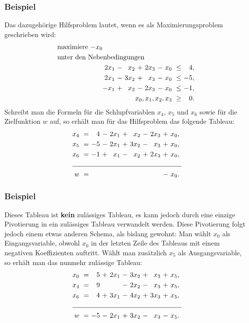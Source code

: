\documentclass[smaller]{beamer}
\begin{document}
\begin{frame}
 \frametitle{Beispiel}
 Das dazugehörige \alert{Hilfsproblem} lautet, wenn es als \alert{Maximierungsproblem} geschrieben wird:
\begin{align*}
\begin{alignedat}{6}
& \text{maximiere $-x_0$} & & & & & & & & &\\
& \rlap{unter den Nebenbedingungen} & & & & & & & & & \\
&& 2x_1 &\ - &\  x_2 &\ + &\ 2x_3 &\ - &\ x_0 &\ \leq &\  4,\ \\ 
&& 2x_1 &\ - &\ 3x_2 &\ + &\  x_3 &\ - &\ x_0 &\ \leq &\ -5,\ \\ 
&& -x_1 &\ + &\  x_2 &\ - &\ 2x_3 &\ - &\ x_0 &\ \leq &\ -1,\ \\ 
&& & & & & & & \llap{$x_0,x_1,x_2,x_3$} &\ \geq &\ 0.\
\end{alignedat}
\end{align*}
Schreibt man die Formeln für die Schlupfvariablen $x_4$, $x_5$ und $x_6$ sowie für die Zielfunktion $w$ auf, so erhält man für das Hilfsproblem das folgende Tableau:
\begin{align*}
\begin{alignedat}{6}
x_4 &\ = &\  4 &\ - &\ 2x_1 &\ + &\  x_2 &\ - &\ 2x_3 &\ + &\ x_0,\ \\
x_5 &\ = &\ -5 &\ - &\ 2x_1 &\ + &\ 3x_2 &\ - &\  x_3 &\ + &\ x_0,\ \\
x_6 &\ = &\ -1 &\ + &\  x_1 &\ - &\  x_2 &\ + &\ 2x_3 &\ + &\ x_0,\ \\ \cline{1-11}
w   &\ = &\    &\   &\      &\   &\      &\   &\      &\ - &\ x_0.\
\end{alignedat}
\end{align*}
\end{frame}

\begin{frame}
 \frametitle{Beispiel}
 \alert{Dieses Tableau ist \textbf{kein} zulässiges Tableau, es kann jedoch durch eine einzige Pivotierung in ein zulässiges Tableau verwandelt werden}. Diese Pivotierung folgt jedoch einem etwas anderen Schema, als bislang gewohnt: Man wählt $x_0$ als Eingangsvariable, obwohl $x_0$ in der letzten Zeile des Tableaus mit einem negativen Koeffizienten auftritt. Wählt man zusätzlich $x_5$ als Ausgangsvariable, so erhält man das nunmehr zulässige Tableau:
\begin{align}
\begin{alignedat}{6}
\label{eq:3:8}
x_0 &\ = &\  5 &\ + &\ 2x_1 &\ - &\ 3x_2 &\ + &\  x_3 &\ + &\ x_5,\ \\
x_4 &\ = &\  9 &\   &\      &\ - &\ 2x_2 &\ - &\  x_3 &\ + &\ x_5,\ \\
x_6 &\ = &\  4 &\ + &\ 3x_1 &\ - &\ 4x_2 &\ + &\ 3x_3 &\ + &\ x_5,\ \\ \cline{1-11}
w   &\ = &\ -5 &\ - &\ 2x_1 &\ + &\ 3x_2 &\ - &\  x_3 &\ - &\ x_5.\
\end{alignedat}
\end{align}
\end{frame}
\end{document}
